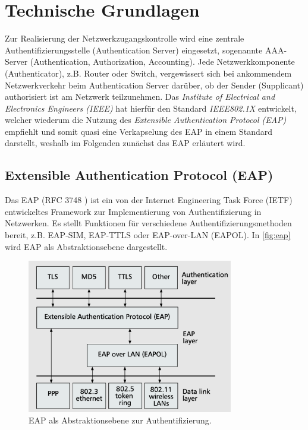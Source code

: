 \documentclass[conference]{IEEEtran}
\begin{document}
%

\section{Technische Grundlagen}
Zur Realisierung der Netzwerkzugangskontrolle wird eine zentrale Authentifizierungsstelle (Authentication Server) eingesetzt, sogenannte AAA-Server (Authentication, Authorization, Accounting). Jede Netzwerkkomponente (Authenticator), z.B. Router oder Switch, vergewissert sich bei ankommendem Netzwerkverkehr beim Authentication Server darüber, ob der Sender (Supplicant) authorisiert ist am Netzwerk teilzunehmen. Das \emph{Institute of Electrical and Electronics Engineers (IEEE)} hat hierfür den Standard \emph{IEEE802.1X} entwickelt, welcher wiederum die Nutzung des \emph{Extensible Authentication Protocol (EAP)} empfiehlt und somit quasi eine Verkapselung des EAP in einem Standard darstellt, weshalb im Folgenden zunächst das EAP erläutert wird.

\subsection{Extensible Authentication Protocol (EAP)}
Das EAP (RFC 3748 \cite{aboba2004extensible}) ist ein von der Internet Engineering Task Force (IETF) entwickeltes Framework zur Implementierung von Authentifizierung in Netzwerken. Es stellt Funktionen für verschiedene Authentifizierungsmethoden bereit, z.B. EAP-SIM, EAP-TTLS oder EAP-over-LAN (EAPOL). \cite{1561920} In \autoref{fig:eap} wird EAP als Abstraktionsebene dargestellt.\\

\begin{figure}[hbt]
	\centering
	\includegraphics[width=9cm]{figures/EAP}
	\caption{EAP als Abstraktionsebene zur Authentifizierung. \cite{1561920}}
	\label{fig:eap}
\end{figure}
\end{document}
